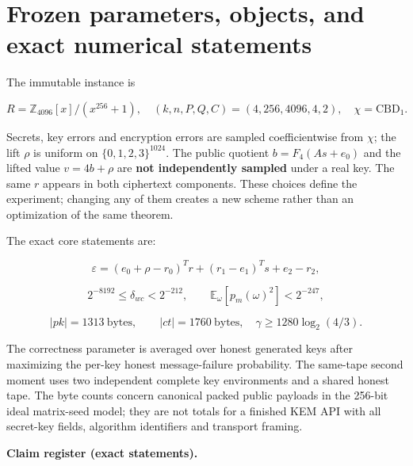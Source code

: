 \documentclass[
  11pt,
  a4paper,
  oneside]{report}
\begin{document}
\section{Frozen parameters, objects, and exact numerical
statements}\label{frozen-parameters-objects-and-exact-numerical-statements}

The immutable instance is

\[
R=\mathbb Z_{4096}[x]/(x^{256}+1),\quad
(k,n,P,Q,C)=(4,256,4096,4,2),\quad \chi=\mathrm{CBD}_1.
\]

Secrets, key errors and encryption errors are sampled coefficientwise
from \(\chi\); the lift \(\rho\) is uniform on \(\{0,1,2,3\}^{1024}\).
The public quotient \(b=F_4(As+e_0)\) and the lifted value \(v=4b+\rho\)
are \textbf{not independently sampled} under a real key. The same \(r\)
appears in both ciphertext components. These choices define the
experiment; changing any of them creates a new scheme rather than an
optimization of the same theorem.

The exact core statements are:

\[
\varepsilon=(e_0+\rho-r_0)^Tr+(r_1-e_1)^Ts+e_2-r_2,
\]

\[
2^{-8192}\le\delta_{wc}<2^{-212},
\qquad
\mathbb E_\omega[p_m(\omega)^2]<2^{-247},
\]

\[
|pk|=1313\ \mathrm{bytes},\qquad
|ct|=1760\ \mathrm{bytes},
\quad\gamma\ge1280\log_2(4/3).
\]

The correctness parameter is averaged over honest generated keys after
maximizing the per-key honest message-failure probability. The same-tape
second moment uses two independent complete key environments and a
shared honest tape. The byte counts concern canonical packed public
payloads in the 256-bit ideal matrix-seed model; they are not totals for
a finished KEM API with all secret-key fields, algorithm identifiers and
transport framing.

\textbf{Claim register (exact statements).}
\end{document}
